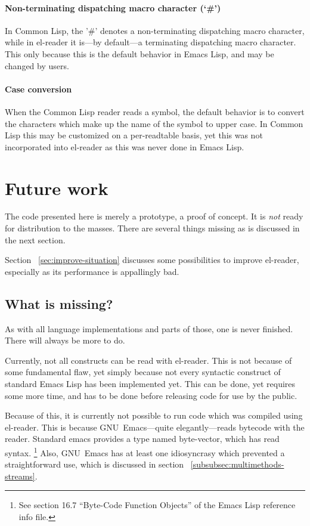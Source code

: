 \documentclass[a4paper,10pt,twoside]{report}
\newcommand{\el}{Emacs Lisp}
\newcommand{\cl}{Common Lisp}
\newcommand{\elr}{el-reader}
\newcommand{\emacs}{GNU~Emacs}
\begin{document}
\subsubsection{Non-terminating dispatching macro character (‘\#’)}
\label{subsubsec:non-term-dispatch}

In \cl{}, the ’\#’ denotes a non-terminating dispatching macro character, while
in \elr{} it is---by default---a terminating dispatching macro character.  This
only because this is the default behavior in \el{}, and may be changed by users.

\subsubsection{Case conversion}
\label{subsubsec:case-conversion}

When the \cl{} reader reads a symbol, the default behavior is to convert the
characters which make up the name of the symbol to upper case.  In \cl{} this
may be customized on a per-readtable basis, yet this was not incorporated into
\elr{} as this was never done in \el{}.

\chapter{Future work}
\label{chap:future-work}

The code presented here is merely a prototype, a proof of concept.  It is
\emph{not} ready for distribution to the masses.  There are several things
missing as is discussed in the next section.

Section ~\ref{sec:improve-situation} discusses some possibilities to improve
\elr{}, especially as its performance is appallingly bad.

\section{What is missing?}
\label{sec:missing}

As with all language implementations and parts of those, one is never finished.
There will always be more to do.

Currently, not all constructs can be read with \elr{}.  This is not because of
some fundamental flaw, yet simply because not every syntactic construct of
standard \el{} has been implemented yet.  This can be done, yet requires some
more time, and has to be done before releasing code for use by the public.

Because of this, it is currently not possible to run code which was compiled
using \elr{}.  This is because \emacs{}---quite elegantly---reads bytecode with
the reader.  Standard emacs provides a type named byte-vector, which has read
syntax. \footnote{See section 16.7 “Byte-Code Function Objects” of the \el{}
  reference info file.\cite{elisp-reference}}  Also, \emacs{} has at least one
idiosyncrasy which prevented a straightforward use, which is discussed in
section ~\ref{subsubsec:multimethods-streams}.
\end{document}
